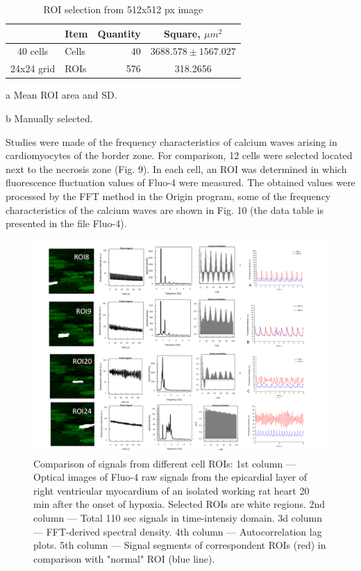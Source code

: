 \documentclass{biophys-new}
\begin{document}
\begin{table}[hb!]
\caption{ROI selection from 512x512 px image}
\label{tab:widgets}
\centering
\begin{threeparttable}
\begin{tabular}{c l r c}
\hline
 & Item & Quantity & Square, $\mu m^2$  \\\hline
40 cells\tnote{b} & Cells & 40 & $3688.578 \pm 1567.027$\tnote{a}  \\
24x24 grid & ROIs & 576 & 318.2656   \\
\hline
\end{tabular}
\begin{tablenotes}
\item[a] Mean ROI area and SD.
\item[b] Manually selected.
\end{tablenotes}
\end{threeparttable}
\end{table}


Studies were made of the frequency characteristics of calcium waves arising in cardiomyocytes of the border zone.
For comparison, 12 cells were selected located next to the necrosis zone (Fig. 9).
In each cell, an ROI was determined in which fluorescence fluctuation values of Fluo-4 were measured.
The obtained values were processed by the FFT method in the Origin program, some of the frequency characteristics of the calcium waves are shown in Fig. 10 (the data table is presented in the file Fluo-4).

\begin{figure}
    \includegraphics[width=0.9\linewidth]{fig5.png}
    \caption{Comparison of signals from different cell ROIs: 1st column --- Optical images of Fluo-4 raw signals from the epicardial layer of right ventricular myocardium of an isolated working rat heart 20 min after the onset of hypoxia. Selected ROIs are white regions. 2nd column --- Total 110 sec signals in time-intensiy domain. 3d column --- FFT-derived spectral density. 4th column --- Autocorrelation lag plots. 5th column --- Signal segments of correspondent ROIs (red) in comparison with "normal" ROI (blue line). }
    \label{fig:fig5}
\end{figure}
\end{document}
